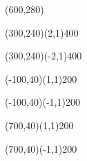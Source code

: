 \documentclass[12pt]{article}
\begin{document}
\begin{figure}[htb]
\hspace*{\fill}
\begin{egame}(600,280)

\renewcommand{\egarrowstyle}{}

%
\putbranch(300,240)(2,1){400}

\renewcommand{\egarrowstyle}{}

\putbranch(300,240)(-2,1){400}

\renewcommand{\egarrowstyle}{}

\putbranch(-100,40)(1,1){200}

\renewcommand{\egarrowstyle}{}

\putbranch(-100,40)(-1,1){200}

\renewcommand{\egarrowstyle}{}

\putbranch(700,40)(1,1){200}

\renewcommand{\egarrowstyle}{}

\putbranch(700,40)(-1,1){200}


\end{egame}
\end{figure}
\end{document}
